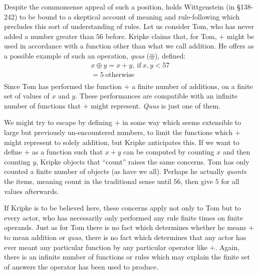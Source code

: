 \documentclass[doc,12pt,apacite,biblatex]{apa6}
\begin{document}
Despite the commonsense appeal of such a position,  holds Wittgenstein (in \S 138-242) to be bound to a skeptical account of meaning and rule-following which precludes this sort of understanding of rules. Let us consider Tom, who has never added a number greater than $56$ before. Kripke claims that, for Tom, $+$ might be used in accordance with a function other than what we call addition. He offers as a possible example of such an operation, \emph{quus} ($\oplus$), defined:
\begin{equation}
\begin{split}
		x \oplus y = x + y,~\mathrm{if}~x,y <57\\
		=5~\mathrm{otherwise} \\
\end{split}
\end{equation}
Since Tom has performed the function $+$ a finite number of additions, on a finite set of values of $x$ and $y$. These performances are compatible with an infinite number of functions that $+$ might represent. \emph{Quus} is just one of them.

We might try to escape by defining $+$ in some way which seems extensible to large but previously un-encountered numbers, to limit the functions which $+$ might represent to solely addition, but Kripke anticipates this. If we want to define $+$ as a function such that $x + y$ can be computed by counting $x$ and then counting $y$, Kripke objects that	``count'' raises the same concerns. Tom has only counted a finite number of objects (as have we all). Perhaps he actually \emph{quonts} the items, meaning count in the traditional sense until $56$, then give $5$ for all values afterwards.

If Kripke is to be believed here, these concerns apply not only to Tom but to every actor, who has necessarily only performed any rule finite times on finite operands. Just as for Tom there is no fact which determines whether he means $+$ to mean addition or \emph{quus}, there is no fact which determines that any actor has ever meant any particular function by any particular operator like $+$. Again, there is an infinite number of functions or rules which may explain the finite set of answers the operator has been used to produce.
\end{document}
